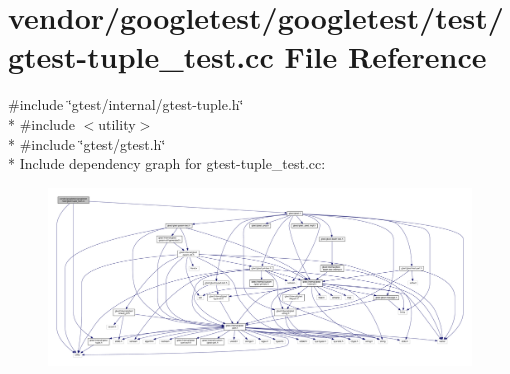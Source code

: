\hypertarget{gtest-tuple__test_8cc}{}\section{vendor/googletest/googletest/test/gtest-\/tuple\+\_\+test.cc File Reference}
\label{gtest-tuple__test_8cc}
{\ttfamily \#include \char`\"{}gtest/internal/gtest-\/tuple.\+h\char`\"{}}\\*
{\ttfamily \#include $<$utility$>$}\\*
{\ttfamily \#include \char`\"{}gtest/gtest.\+h\char`\"{}}\\*
Include dependency graph for gtest-\/tuple\+\_\+test.cc\+:\nopagebreak
\begin{figure}[H]
\begin{center}
\leavevmode
\includegraphics[width=350pt]{gtest-tuple__test_8cc__incl}
\end{center}
\end{figure}
